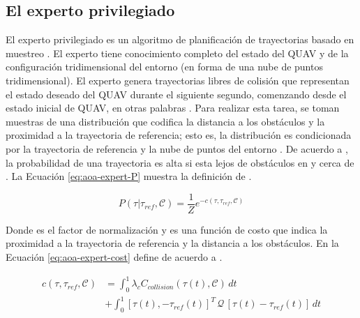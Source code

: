 \subsection{El experto privilegiado} 

El experto privilegiado es un algoritmo de planificación de trayectorias basado en muestreo \cite{Loquercio2021}. El experto tiene conocimiento completo del estado del QUAV y de la configuración tridimensional del entorno (en forma de una nube de puntos tridimensional). El experto genera trayectorias libres de colisión \jim{\tau} que representan el estado deseado del QUAV  durante el siguiente segundo, comenzando desde el estado inicial de QUAV, en otras palabras . Para realizar esta tarea, se toman muestras de una distribución  que codifica la distancia a los obstáculos y la proximidad a la trayectoria de referencia; esto es, la distribución  es condicionada por la trayectoria de referencia  y la nube de puntos del entorno . De acuerdo a , la probabilidad de una trayectoria \jim{\tau} es alta si esta lejos de obstáculos en  y cerca de . La Ecuación \ref{eq:aoa-expert-P} muestra la definición de  \cite{Loquercio2021}.

\begin{equation}
\label{eq:aoa-expert-P}
    P(\tau | \tau_{ref}, \mathcal{C}) = \frac{1}{Z} e^{-c(\tau, \tau_{ref}, \mathcal{C})}
\end{equation}

Donde  es el factor de normalización y  es una función de costo que indica la proximidad a la trayectoria de referencia y la distancia a los obstáculos. En la Ecuación \ref{eq:aoa-expert-cost} define  de acuerdo a \cite{Loquercio2021}.

\begin{equation}
\label{eq:aoa-expert-cost}
\begin{split}
    c(\tau, \tau_{ref}, \mathcal{C}) &  = \int_{0}^{1}{\lambda_{c} C_{collision}(\tau(t), \mathcal{C}) \, dt} \\
                                     & + \int_{0}^{1}{[\tau(t), - \tau_{ref}(t)]^{T} \, \mathcal{Q} \, [\tau(t) - \tau_{ref}(t)] \, dt}
\end{split}
\end{equation}

